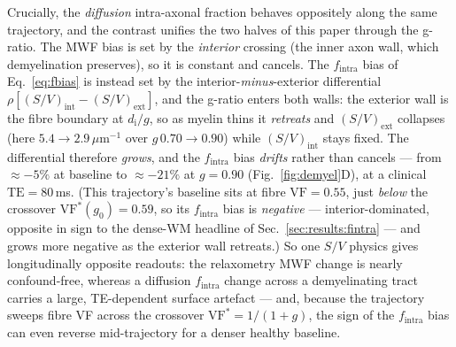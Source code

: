 Crucially, the \emph{diffusion} intra-axonal fraction behaves oppositely along the same
trajectory, and the contrast unifies the two halves of this paper through the g-ratio. The MWF
bias is set by the \emph{interior} crossing (the inner axon wall, which demyelination
preserves), so it is constant and cancels. The $f_{\mathrm{intra}}$ bias of Eq.~\eqref{eq:fbias}
is instead set by the interior-\emph{minus}-exterior differential $\rho[(S/V)_{\mathrm{int}}-(S/V)_{\mathrm{ext}}]$,
and the g-ratio enters both walls: the exterior wall is the fibre boundary at $d_{\mathrm i}/g$,
so as myelin thins it \emph{retreats} and $(S/V)_{\mathrm{ext}}$ collapses (here $5.4\!\to\!2.9\,\mu$m$^{-1}$
over $g\,0.70\!\to\!0.90$) while $(S/V)_{\mathrm{int}}$ stays fixed. The differential therefore
\emph{grows}, and the $f_{\mathrm{intra}}$ bias \emph{drifts} rather than cancels --- from
${\approx}{-}5\%$ at baseline to ${\approx}{-}21\%$ at $g=0.90$ (Fig.~\ref{fig:demyel}D), at a
clinical $\mathrm{TE}=80$\,ms. (This trajectory's baseline sits at fibre $\mathrm{VF}=0.55$,
just \emph{below} the crossover $\mathrm{VF}^{\ast}(g_0)=0.59$, so its $f_{\mathrm{intra}}$ bias
is \emph{negative} --- interior-dominated, opposite in sign to the dense-WM headline of
Sec.~\ref{sec:results:fintra} --- and grows more negative as the exterior wall retreats.)
So one $S/V$ physics gives longitudinally opposite readouts: the
relaxometry MWF change is nearly confound-free, whereas a diffusion $f_{\mathrm{intra}}$ change
across a demyelinating tract carries a large, TE-dependent surface artefact --- and, because the
trajectory sweeps fibre VF across the crossover $\mathrm{VF}^{\ast}=1/(1+g)$, the sign of the
$f_{\mathrm{intra}}$ bias can even reverse mid-trajectory for a denser healthy baseline.

